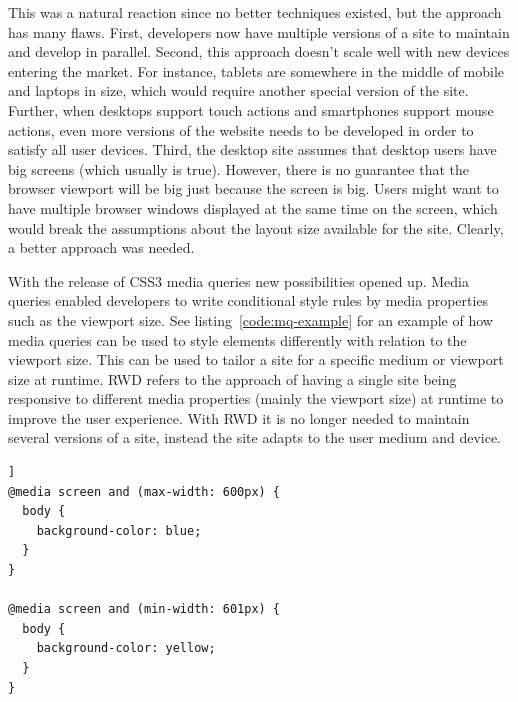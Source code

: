 \documentclass[a4paper,11pt]{kth-mag}
\begin{document}
        This was a natural reaction since no better techniques existed, but the approach has many flaws.
        First, developers now have multiple versions of a site to maintain and develop in parallel.
        Second, this approach doesn't scale well with new devices entering the market. 
        For instance, tablets are somewhere in the middle of mobile and laptops in size, which would require another special version of the site.
        Further, when desktops support touch actions and smartphones support mouse actions, even more versions of the website needs to be developed in order to satisfy all user devices.
        Third, the desktop site assumes that desktop users have big screens (which usually is true).
        However, there is no guarantee that the \gls{browser} \gls{viewport} will be big just because the screen is big.
        Users might want to have multiple \gls{browser} windows displayed at the same time on the screen, which would break the assumptions about the layout size available for the site.
        Clearly, a better approach was needed.

        With the release of \gls{CSS3} \gls{media queries} new possibilities opened up.
        Media queries enabled developers to write conditional style rules by media properties such as the \gls{viewport} size.
        See listing~\ref{code:mq-example} for an example of how \gls{media queries} can be used to style \glspl{element} differently with relation to the viewport size.
        This can be used to tailor a site for a specific medium or \gls{viewport} size at runtime.
        \gls{RWD} refers to the approach of having a single site being \gls{responsive} to different media properties (mainly the \gls{viewport} size) at runtime to improve the user experience.
        With \gls{RWD} it is no longer needed to maintain several versions of a site, instead the site adapts to the user medium and device.

        \begin{lstlisting}[label={code:mq-example},caption={The above \gls{CSS} styles the body of the website blue if the \gls{viewport} is less or equal to 600 pixels wide, and yellow otherwise.},captionpos=b]]
@media screen and (max-width: 600px) {
  body {
    background-color: blue;
  }
}

@media screen and (min-width: 601px) {
  body {
    background-color: yellow;
  }
}
        \end{lstlisting}
\end{document}
